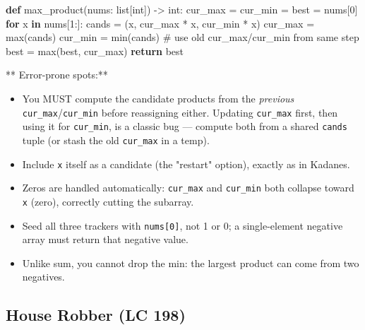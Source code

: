 \documentclass[11pt]{article}
\providecommand{\tightlist}{\setlength{\itemsep}{1pt}\setlength{\parskip}{0pt}}
\newenvironment{Shaded}{\begin{snugshade}}{\end{snugshade}}
\newcommand{\BuiltInTok}[1]{\textcolor[rgb]{0.50,0.55,0.55}{#1}}
\newcommand{\CommentTok}[1]{\textcolor[rgb]{0.48,0.49,0.49}{#1}}
\newcommand{\ControlFlowTok}[1]{\textcolor[rgb]{0.99,0.74,0.29}{\textbf{#1}}}
\newcommand{\DecValTok}[1]{\textcolor[rgb]{0.96,0.45,0.00}{#1}}
\newcommand{\KeywordTok}[1]{\textcolor[rgb]{0.81,0.81,0.76}{\textbf{#1}}}
\newcommand{\NormalTok}[1]{\textcolor[rgb]{0.81,0.81,0.76}{#1}}
\newcommand{\OperatorTok}[1]{\textcolor[rgb]{0.81,0.81,0.76}{#1}}
\begin{document}

\begin{Shaded}
\begin{Highlighting}[]
\KeywordTok{def}\NormalTok{ max\_product(nums: }\BuiltInTok{list}\NormalTok{[}\BuiltInTok{int}\NormalTok{]) }\OperatorTok{{-}\textgreater{}} \BuiltInTok{int}\NormalTok{:}
\NormalTok{    cur\_max }\OperatorTok{=}\NormalTok{ cur\_min }\OperatorTok{=}\NormalTok{ best }\OperatorTok{=}\NormalTok{ nums[}\DecValTok{0}\NormalTok{]}
    \ControlFlowTok{for}\NormalTok{ x }\KeywordTok{in}\NormalTok{ nums[}\DecValTok{1}\NormalTok{:]:}
\NormalTok{        cands }\OperatorTok{=}\NormalTok{ (x, cur\_max }\OperatorTok{*}\NormalTok{ x, cur\_min }\OperatorTok{*}\NormalTok{ x)}
\NormalTok{        cur\_max }\OperatorTok{=} \BuiltInTok{max}\NormalTok{(cands)}
\NormalTok{        cur\_min }\OperatorTok{=} \BuiltInTok{min}\NormalTok{(cands)       }\CommentTok{\# use old cur\_max/cur\_min from same step}
\NormalTok{        best }\OperatorTok{=} \BuiltInTok{max}\NormalTok{(best, cur\_max)}
    \ControlFlowTok{return}\NormalTok{ best}
\end{Highlighting}
\end{Shaded}

** Error-prone spots:**

\begin{itemize}
\tightlist
\item
  You MUST compute the candidate products from the \emph{previous} \texttt{cur\_max}/\texttt{cur\_min} before reassigning either. Updating \texttt{cur\_max} first, then using it for \texttt{cur\_min}, is a classic bug --- compute both from a shared \texttt{cands} tuple (or stash the old \texttt{cur\_max} in a temp).
\item
  Include \texttt{x} itself as a candidate (the "restart" option), exactly as in Kadane\textquotesingle s.
\item
  Zeros are handled automatically: \texttt{cur\_max} and \texttt{cur\_min} both collapse toward \texttt{x} (zero), correctly cutting the subarray.
\item
  Seed all three trackers with \texttt{nums{[}0{]}}, not 1 or 0; a single-element negative array must return that negative value.
\item
  Unlike sum, you cannot drop the min: the largest product can come from two negatives.
\end{itemize}

\subsection{House Robber (LC 198)}\label{house-robber-lc-198}
\end{document}
